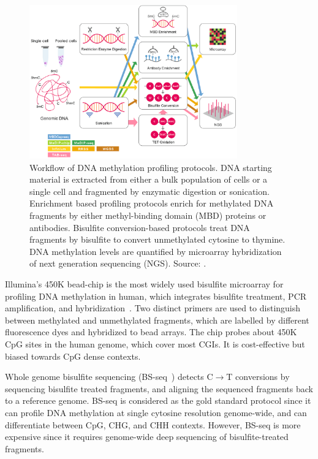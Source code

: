 \begin{figure}[htbp!]
\centering
\includegraphics[width=0.8\textwidth]{seq}
\caption[Workflow of DNA methylation profiling protocols.]{Workflow of DNA methylation profiling protocols. DNA starting material is extracted from either a bulk population of cells or a single cell and fragmented by enzymatic digestion or sonication. Enrichment based profiling protocols enrich for methylated DNA fragments by either methyl-binding domain (MBD) proteins or antibodies. Bisulfite conversion-based protocols treat DNA fragments by bisulfite to convert unmethylated cytosine to thymine. DNA methylation levels are quantified by microarray hybridization of next generation sequencing (NGS). Source: \citet{yong_profiling_2016}.}
\label{fig:intro_seq}
\end{figure}

Illumina's 450K bead-chip is the most widely used bisulfite microarray for profiling DNA methylation in human, which integrates bisulfite treatment, PCR amplification, and hybridization~\citep{bibikova_high_2011-1}. Two distinct primers are used to distinguish between methylated and unmethylated fragments, which are labelled by different fluorescence dyes and hybridized to bead arrays.  The chip probes about 450K CpG sites in the human genome, which cover most CGIs. It is cost-effective but biased towards CpG dense contexts.

Whole genome bisulfite sequencing (BS-seq~\citep{urich_methylc-seq_2015}) detects C$\rightarrow$T conversions by sequencing bisulfite treated fragments, and aligning the sequenced fragments back to a reference genome. BS-seq is considered as the gold standard protocol since it can profile DNA methylation at single cytosine resolution genome-wide, and can differentiate between CpG, CHG, and CHH contexts. However, BS-seq is more expensive since it requires genome-wide deep sequencing of bisulfite-treated fragments.

